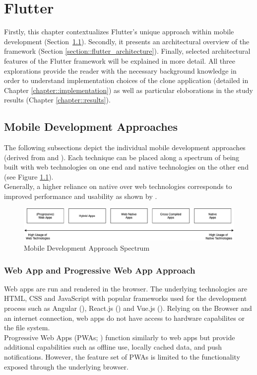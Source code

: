 \chapter{Flutter} \label{chapter::flutter}
Firstly, this chapter contextualizes Flutter's unique approach within mobile development (Section~\ref{section::other_architectures}). 
Secondly, it presents an architectural overview of the framework (Section \ref{section::flutter_architecture}). 
Finally, selected architectural features of the Flutter framework will be explained in more detail.
All three explorations provide the reader with the necessary background knowledge in order to understand implementation choices of the clone application (detailed in Chapter \ref{chapter::implementation}) 
as well as particular eloborations in the study results (Chapter \ref{chapter::results}).

\section{Mobile Development Approaches} \label{section::other_architectures}
The following subsections depict the individual mobile development approaches (derived from \cite{Heitkoetter2013} and \cite{Cunha2018}).
Each technique can be placed along a spectrum of being built with web technologies on one end and native technologies on the other end (see Figure \ref{fig::mobile_development_approach_spectrum}).\\
Generally, a higher reliance on native over web technologies corresponds to improved performance and usability as shown by \textcite{Heitkoetter2013}.

\begin{figure}
    \centering
    \includegraphics[width=\linewidth]{images/architectures/mobile_development_approaches.eps}
    \caption{Mobile Development Approach Spectrum}
    \label{fig::mobile_development_approach_spectrum}
\end{figure}


\subsection{Web App and Progressive Web App Approach} \label{subsection::web_apps}
Web apps are run and rendered in the browser. The underlying technologies are HTML, CSS and JavaScript with popular frameworks 
used for the development process such as Angular (\cite{Angular2021}), React.js (\cite{React2021}) and Vue.js (\cite{Vue2021}). 
Relying on the Browser and an internet connection, web apps do not have access to hardware capabilites or the file system.\\
Progressive Web Apps (PWAs; \cite{MozillaFoundation2021}) function similarly to web apps but provide additional capabilities such as offline use, locally cached data, 
and push notifications. However, the feature set of PWAs is limited to the functionality exposed through the underlying browser.

